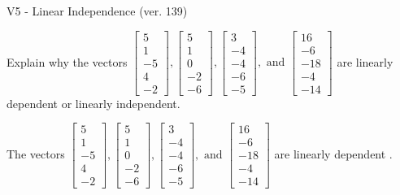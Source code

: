 \begin{exercise}
  \begin{exerciseTitle}V5 - Linear Independence (ver. 139)\end{exerciseTitle}
  \begin{exerciseStatement}
    Explain why the vectors \(\left[\begin{array}{r}
5 \\
1 \\
-5 \\
4 \\
-2
\end{array}\right] , \left[\begin{array}{r}
5 \\
1 \\
0 \\
-2 \\
-6
\end{array}\right] , \left[\begin{array}{r}
3 \\
-4 \\
-4 \\
-6 \\
-5
\end{array}\right] , \text{ and } \left[\begin{array}{r}
16 \\
-6 \\
-18 \\
-4 \\
-14
\end{array}\right]\) are linearly dependent or linearly independent.	


  \end{exerciseStatement}
  \begin{exerciseAnswer}
   The vectors \(\left[\begin{array}{r}
5 \\
1 \\
-5 \\
4 \\
-2
\end{array}\right] , \left[\begin{array}{r}
5 \\
1 \\
0 \\
-2 \\
-6
\end{array}\right] , \left[\begin{array}{r}
3 \\
-4 \\
-4 \\
-6 \\
-5
\end{array}\right] , \text{ and } \left[\begin{array}{r}
16 \\
-6 \\
-18 \\
-4 \\
-14
\end{array}\right]\) are 
  	 linearly dependent  .
  


  \end{exerciseAnswer}
\end{exercise}